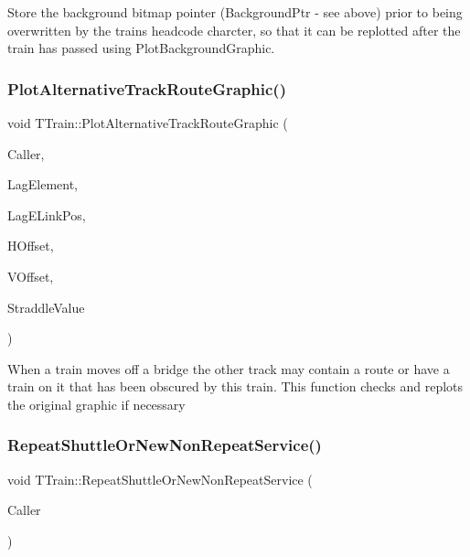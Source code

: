 Store the background bitmap pointer (Background\+Ptr -\/ see above) prior to being overwritten by the train\textquotesingle{}s headcode charcter, so that it can be replotted after the train has passed using Plot\+Background\+Graphic. \mbox{\label{class_t_train_aa21e18b3085773ca8351c446911611c1}} 
\subsubsection{\texorpdfstring{Plot\+Alternative\+Track\+Route\+Graphic()}{PlotAlternativeTrackRouteGraphic()}}
{\footnotesize\ttfamily void T\+Train\+::\+Plot\+Alternative\+Track\+Route\+Graphic (\begin{DoxyParamCaption}\item[{int}]{Caller,  }\item[{unsigned int}]{Lag\+Element,  }\item[{int}]{Lag\+E\+Link\+Pos,  }\item[{int}]{H\+Offset,  }\item[{int}]{V\+Offset,  }\item[{T\+Straddle}]{Straddle\+Value }\end{DoxyParamCaption})\hspace{0.3cm}{\ttfamily [private]}}

When a train moves off a bridge the other track may contain a route or have a train on it that has been obscured by this train. This function checks and replots the original graphic if necessary \mbox{\label{class_t_train_a8262f447ec811db7e524c7bb885226c5}} 
\subsubsection{\texorpdfstring{Repeat\+Shuttle\+Or\+New\+Non\+Repeat\+Service()}{RepeatShuttleOrNewNonRepeatService()}}
{\footnotesize\ttfamily void T\+Train\+::\+Repeat\+Shuttle\+Or\+New\+Non\+Repeat\+Service (\begin{DoxyParamCaption}\item[{int}]{Caller }\end{DoxyParamCaption})\hspace{0.3cm}{\ttfamily [private]}}

